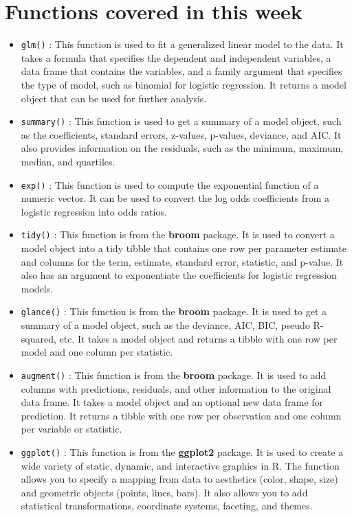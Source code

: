 \documentclass[
]{book}
\providecommand{\tightlist}{%
  \setlength{\itemsep}{0pt}\setlength{\parskip}{0pt}}
\begin{document}
\hypertarget{functions-covered-in-this-week}{%
\section{Functions covered in this week}\label{functions-covered-in-this-week}}

\begin{itemize}
\tightlist
\item
  \texttt{glm()} : This function is used to fit a generalized linear model to the data. It takes a formula that specifies the dependent and independent variables, a data frame that contains the variables, and a family argument that specifies the type of model, such as binomial for logistic regression. It returns a model object that can be used for further analysis.
\item
  \texttt{summary()} : This function is used to get a summary of a model object, such as the coefficients, standard errors, z-values, p-values, deviance, and AIC. It also provides information on the residuals, such as the minimum, maximum, median, and quartiles.
\item
  \texttt{exp()} : This function is used to compute the exponential function of a numeric vector. It can be used to convert the log odds coefficients from a logistic regression into odds ratios.
\item
  \texttt{tidy()} : This function is from the \textbf{broom} package. It is used to convert a model object into a tidy tibble that contains one row per parameter estimate and columns for the term, estimate, standard error, statistic, and p-value. It also has an argument to exponentiate the coefficients for logistic regression models.
\item
  \texttt{glance()} : This function is from the \textbf{broom} package. It is used to get a summary of a model object, such as the deviance, AIC, BIC, pseudo R-squared, etc. It takes a model object and returns a tibble with one row per model and one column per statistic.
\item
  \texttt{augment()} : This function is from the \textbf{broom} package. It is used to add columns with predictions, residuals, and other information to the original data frame. It takes a model object and an optional new data frame for prediction. It returns a tibble with one row per observation and one column per variable or statistic.
\item
  \texttt{ggplot()} : This function is from the \textbf{ggplot2} package. It is used to create a wide variety of static, dynamic, and interactive graphics in R. The function allows you to specify a mapping from data to aesthetics (color, shape, size) and geometric objects (points, lines, bars). It also allows you to add statistical transformations, coordinate systems, faceting, and themes.

\end{itemize}
\end{document}
